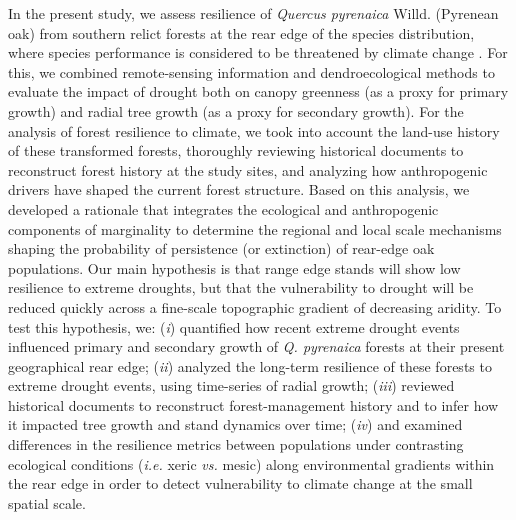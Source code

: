 In the present study, we assess resilience of \emph{Quercus pyrenaica} Willd. (Pyrenean oak) from southern relict forests at the rear edge of the species distribution, where species performance is considered to be threatened by climate change \autocite{GeaIzquierdoetal2013GrowthProjections,GeaIzquierdoetal2017RiskyFuture}. For this, we combined remote-sensing information and dendroecological methods to evaluate the impact of drought both on canopy greenness (as a proxy for primary growth) and radial tree growth (as a proxy for secondary growth). For the analysis of forest resilience to climate, we took into account the land-use history of these transformed forests, thoroughly reviewing historical documents to reconstruct forest history at the study sites, and analyzing how anthropogenic drivers have shaped the current forest structure. Based on this analysis, we developed a rationale that integrates the ecological and anthropogenic components of marginality to determine the regional and local scale mechanisms shaping the probability of persistence (or extinction) of rear-edge oak populations. Our main hypothesis is that range edge stands will show low resilience to extreme droughts, but that the vulnerability to drought will be reduced quickly across a fine-scale topographic gradient of decreasing aridity. To test this hypothesis, we: (\emph{i}) quantified how recent extreme drought events influenced primary and secondary growth of \emph{Q. pyrenaica} forests at their present geographical rear edge; (\emph{ii}) analyzed the long-term resilience of these forests to extreme drought events, using time-series of radial growth; (\emph{iii}) reviewed historical documents to reconstruct forest-management history and to infer how it impacted tree growth and stand dynamics over time; (\emph{iv}) and examined differences in the resilience metrics between populations under contrasting ecological conditions (\emph{i.e.} xeric \emph{vs.} mesic) along environmental gradients within the rear edge in order to detect vulnerability to climate change at the small spatial scale.

